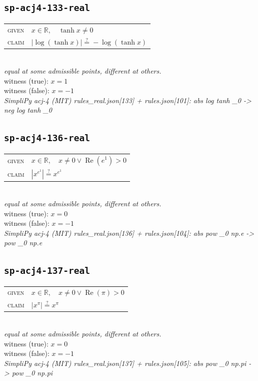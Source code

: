 \documentclass[11pt]{article}
\begin{document}
\subsection*{\texttt{sp-acj4-133-real}}
\begin{tabular}{@{}l@{\quad}l@{}}
\textsc{given} & $x \in \mathbb{R},\quad \tanh x \neq 0$ \\[4pt]
\textsc{claim} & $\displaystyle \left|\log\left(\tanh x\right)\right| \overset{?}{=} -\log\left(\tanh x\right)$ \\
\end{tabular}\\[2pt]
{\small\emph{equal at some admissible points, different at others.}}\\
{\footnotesize\color{gray}witness (true): $x = 1$}\\
{\footnotesize\color{gray}witness (false): $x = -1$}\\
\emph{SimpliPy acj-4 (MIT) rules\_real.json[133] + rules.json[101]: abs log tanh \_0  ->  neg log tanh \_0}\\

\subsection*{\texttt{sp-acj4-136-real}}
\begin{tabular}{@{}l@{\quad}l@{}}
\textsc{given} & $x \in \mathbb{R},\quad x \neq 0 \lor \operatorname{Re}\left(e^{1}\right) > 0$ \\[4pt]
\textsc{claim} & $\displaystyle \left|x^{e^{1}}\right| \overset{?}{=} x^{e^{1}}$ \\
\end{tabular}\\[2pt]
{\small\emph{equal at some admissible points, different at others.}}\\
{\footnotesize\color{gray}witness (true): $x = 0$}\\
{\footnotesize\color{gray}witness (false): $x = -1$}\\
\emph{SimpliPy acj-4 (MIT) rules\_real.json[136] + rules.json[104]: abs pow \_0 np.e  ->  pow \_0 np.e}\\

\subsection*{\texttt{sp-acj4-137-real}}
\begin{tabular}{@{}l@{\quad}l@{}}
\textsc{given} & $x \in \mathbb{R},\quad x \neq 0 \lor \operatorname{Re}\left(\pi\right) > 0$ \\[4pt]
\textsc{claim} & $\displaystyle \left|x^{\pi}\right| \overset{?}{=} x^{\pi}$ \\
\end{tabular}\\[2pt]
{\small\emph{equal at some admissible points, different at others.}}\\
{\footnotesize\color{gray}witness (true): $x = 0$}\\
{\footnotesize\color{gray}witness (false): $x = -1$}\\
\emph{SimpliPy acj-4 (MIT) rules\_real.json[137] + rules.json[105]: abs pow \_0 np.pi  ->  pow \_0 np.pi}\\
\end{document}
